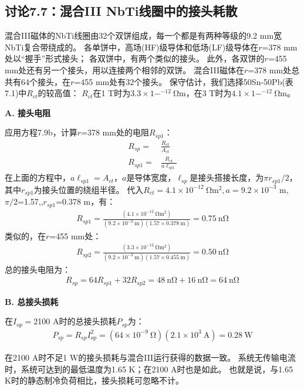 \subsection{讨论7.7：混合III NbTi线圈中的接头耗散}
混合III磁体的NbTi线圈由32个双饼组成，每一个都是有两种等级的9.2 mm宽NbTi复合带绕成的。
各单饼中，高场(HF)级导体和低场(LF)级导体在$r$=378 mm处以“握手”形式接头；
各双饼中，有两个类似的接头。
此外，各双饼的$r$=455 mm处还有另一个接头，用以连接两个相邻的双饼。
混合III磁体在$r$=378 mm处总共有64个接头，在$r$=455 mm处有32个接头。
保守估计，我们选择50Sn-50Pb(表7.1)中$R_{ct}$的较高值：
$R_{ct}$在1 T时为$3.3\times 1-^{-12}\ \mathrm{\Omega m}$，在3 T时为$4.1\times 1-^{-12}\ \mathrm{\Omega m}$。

\textbf{A. 接头电阻}

应用方程7.9b，计算$r$=378 mm处的电阻$R_{sp1}$：
\begin{align*}%
R_{sp}=&\frac{R_{ct}}{A_{ct}}\\\tag{7.9b}
R_{sp1}=&\frac{R_{ct}}{a\ell_{sp1}}
\end{align*}
在上面的方程中，$a\ell_{sp1}=A_{ct}$，$a$是导体宽度，$\ell_{sp}$是接头搭接长度，为$\pi r_{sp1}/2$，
其中$r_{sp1}$为接头位置的绕组半径。
代入$R_{ct}=4.1\times 10^{-12}\ \mathrm{\Omega m^2},a=9.2\times 10^{-3}$ m,$\pi/2$=1.57,,$r_{sp1}$=0.378 m，有：
\begin{align*}%
R_{sp1}=\frac{(4.1\times 10^{-12}\ \mathrm{\Omega m^2})}{(9.2\times 10^{-3}\ \mathrm{m})(1.57\times 0.378\ \mathrm{m})}=0.75\ \mathrm{n\Omega}
\end{align*}
类似的，在$r$=455 mm处：
\begin{align*}%
R_{sp2}=\frac{(3.3\times 10^{-12}\ \mathrm{\Omega m^2})}{(9.2\times 10^{-3}\ \mathrm{m})(1.57\times 0.455\ \mathrm{m})}=0.50\ \mathrm{n\Omega}
\end{align*}
总的接头电阻为：
\begin{align*}%
R_{sp}=64R_{sp1}+32R_{sp2}=48\ \mathrm{n\Omega}+16\ \mathrm{n\Omega}=64\ \mathrm{n\Omega}
\end{align*}

\textbf{B. 总接头损耗}

在$I_{op}=$2100 A时的总接头损耗$P_{sp}$为：
\begin{align*}%
P_{sp}=R_{sp}I_{op}^{2}=(64\times 10^{-9}\ \mathrm{\Omega})(2.1\times 10^3\ \mathrm{A})=0.28\ \mathrm{W}\tag{S8.5}
\end{align*}

在2100 A时不足1 W的接头损耗与混合III运行获得的数据一致。
系统无传输电流时，系统可达到的最低温度为1.65 K；在2100 A时也是如此。
也就是说，与1.65 K时的静态制冷负荷相比，接头损耗可忽略不计。


